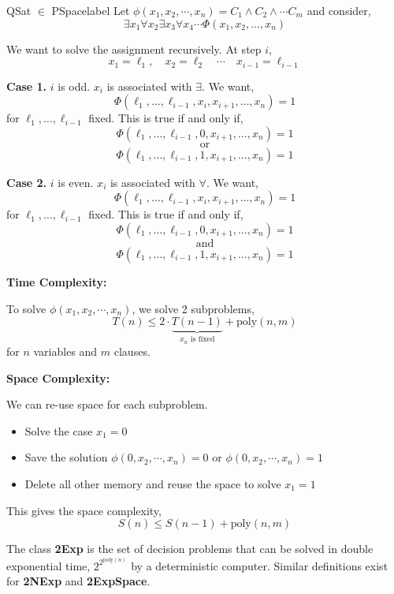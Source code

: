 	\begin{ex}{QSat $\in$ PSpace}{label}
		Let $\phi(x_1, x_2, \cdots, x_n) = C_1 \land C_2 \land \cdots C_m$ and consider,
		\[\exists x_{1} \forall x_{2} \exists x_{3} \forall x_{4} \cdots \Phi\left(x_{1}, x_{2}, \ldots, x_{n}\right)\]

		We want to solve the assignment recursively. At step $i$,
		\[x_1 = \ell_1, \quad x_2 = \ell_2  \quad \cdots \quad x_{i-1} = \ell_{i-1}\]

		\textbf{Case 1.} $i$ is odd.
		$x_i$ is associated with $\exists$. We want,
		\[\Phi\left(\ell_{1}, \ldots, \ell_{i-1}, x_{i}, x_{i+1}, \ldots, x_{n}\right)=1\]
		for $\ell_{1}, \ldots, \ell_{i-1}$ fixed. This is true if and only if,
		\[\Phi\left(\ell_{1}, \ldots, \ell_{i-1}, 0, x_{i+1}, \ldots, x_{n}\right)=1\]
		\[\text{or}\]
		\[\Phi\left(\ell_{1}, \ldots, \ell_{i-1}, 1, x_{i+1}, \ldots, x_{n}\right)=1\]

		\textbf{Case 2.} $i$ is even.
		$x_i$ is associated with $\forall$. We want,
		\[\Phi\left(\ell_{1}, \ldots, \ell_{i-1}, x_{i}, x_{i+1}, \ldots, x_{n}\right)=1\]
		for $\ell_{1}, \ldots, \ell_{i-1}$ fixed. This is true if and only if,
		\[\Phi\left(\ell_{1}, \ldots, \ell_{i-1}, 0, x_{i+1}, \ldots, x_{n}\right)=1\]
		\[\text{and}\]
		\[\Phi\left(\ell_{1}, \ldots, \ell_{i-1}, 1, x_{i+1}, \ldots, x_{n}\right)=1\]


		\textbf{Time Complexity:}

		To solve $\phi(x_1, x_2, \cdots, x_n)$, we solve 2 subproblems,
		\[T(n) \leq 2 \cdot \underbrace{T(n-1)}_{\text{$x_n$ is fixed}} + \text{poly}(n,m)\]
		for $n$ variables and $m$ clauses.

		\vphantom{.}

		\textbf{Space Complexity:}

		We can re-use space for each subproblem.
		\begin{itemize}
			\item Solve the case $x_1 = 0$
			\item Save the solution $\phi(0, x_2, \cdots, x_n) = 0$ or $\phi(0, x_2, \cdots, x_n) = 1$
			\item Delete all other memory and reuse the space to solve $x_1 = 1$
		\end{itemize}
		This gives the space complexity,
		\[S(n) \leq S(n-1) + \text{poly}(n,m)\]
	\end{ex}

	\begin{defn}[2Exp]
		The class \textbf{2Exp} is the set of decision problems that can be solved in double exponential time, $2^{2^{\text{poly}(n)}}$ by a deterministic computer. Similar definitions exist for \textbf{2NExp} and \textbf{2ExpSpace}.
	\end{defn}

